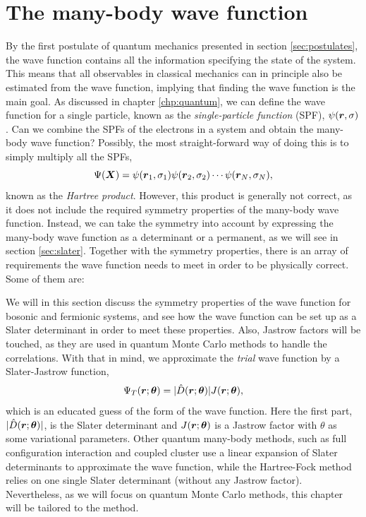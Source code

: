 \section{The many-body wave function} \label{sec:wavefunction}
By the first postulate of quantum mechanics presented in section \ref{sec:postulates}, the wave function contains all the information specifying the state of the system. This means that all observables in classical mechanics can in principle also be estimated from the wave function, implying that finding the wave function is the main goal. As discussed in chapter \ref{chp:quantum}, we can define the wave function for a single particle, known as the \textit{single-particle function} (SPF), $\psi(\boldsymbol{{r}},\sigma)$. Can we combine the SPFs of the electrons in a system and obtain the many-body wave function? Possibly, the most straight-forward way of doing this is to simply multiply all the SPFs,
\begin{equation}
\Psi(\boldsymbol{{X}})=\psi(\boldsymbol{{r}}_1,\sigma_1)\psi(\boldsymbol{{r}}_2,\sigma_2)\cdots\psi(\boldsymbol{{r}}_N,\sigma_N),
\end{equation}
known as the \textit{Hartree product}. However, this product is generally not correct, as it does not include the required symmetry properties of the many-body wave function. Instead, we can take the symmetry into account by expressing the many-body wave function as a determinant or a permanent, as we will see in section \ref{sec:slater}. Together with the symmetry properties, there is an array of requirements the wave function needs to meet in order to be physically correct. Some of them are:

\iffalse
We will in this section discuss the symmetry properties of the wave function for bosonic and fermionic systems, and see how the wave function can be set up as a Slater determinant in order to meet these properties. Also, Jastrow factors will be touched, as they are used in quantum Monte Carlo methods to handle the correlations. With that in mind, we approximate the \textit{trial} wave function by a Slater-Jastrow function,
\begin{equation}
\Psi_T(\boldsymbol{{r}};\boldsymbol{{\theta}})=|\hat{D}(\boldsymbol{{r}};\boldsymbol{{\theta}})|J(\boldsymbol{{r}};\boldsymbol{{\theta}}),
\end{equation}
which is an educated guess of the form of the wave function. 
Here the first part, $|\hat{D}(\boldsymbol{{r}};\boldsymbol{{\theta}})|$, is the Slater determinant and $J(\boldsymbol{{r}};\boldsymbol{{\theta}})$ is a Jastrow factor with $\theta$ as some variational parameters. Other quantum many-body methods, such as full configuration interaction and coupled cluster use a linear expansion of Slater determinants to approximate the wave function, while the Hartree-Fock method relies on one single Slater determinant (without any Jastrow factor). Nevertheless, as we will focus on quantum Monte Carlo methods, this chapter will be tailored to the method. 

